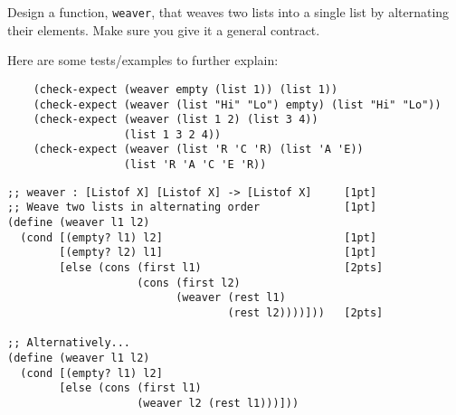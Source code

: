\documentclass[12pt]{article}                   %
\def\pts#1{\marginpar{\footnotesize \raggedright  \fbox{#1 {\sc Points}}}}
\newenvironment{solution}{}{}
\begin{document}
\begin{problem} \pts{8}

  Design a function, \texttt{weaver}, that weaves two lists into a
  single list by alternating their elements.  Make sure you give it a
  general contract.

\bigskip

\noindent Here are some tests/examples to further explain:

\begin{verbatim}
    (check-expect (weaver empty (list 1)) (list 1))
    (check-expect (weaver (list "Hi" "Lo") empty) (list "Hi" "Lo"))
    (check-expect (weaver (list 1 2) (list 3 4))
                  (list 1 3 2 4))
    (check-expect (weaver (list 'R 'C 'R) (list 'A 'E))
                  (list 'R 'A 'C 'E 'R))
\end{verbatim}

\begin{solution}
\begin{verbatim}
;; weaver : [Listof X] [Listof X] -> [Listof X]     [1pt]
;; Weave two lists in alternating order             [1pt]
(define (weaver l1 l2)
  (cond [(empty? l1) l2]                            [1pt]
        [(empty? l2) l1]                            [1pt]
        [else (cons (first l1)                      [2pts]
                    (cons (first l2)
                          (weaver (rest l1)
                                  (rest l2))))]))   [2pts]

;; Alternatively...
(define (weaver l1 l2)
  (cond [(empty? l1) l2]
        [else (cons (first l1)
                    (weaver l2 (rest l1)))]))
\end{verbatim}
\end{solution}

\end{problem}

\ifrubric\bigskip\else
{}
\newpage
\fi
\end{document}
